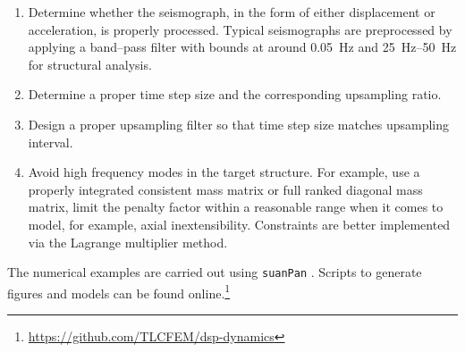\begin{enumerate}
\item Determine whether the seismograph, in the form of either displacement or acceleration, is properly processed. Typical seismographs are preprocessed by applying a band--pass filter with bounds at around \SI{0.05}{\hertz} and \SIrange{25}{50}{\hertz} for structural analysis.
\item Determine a proper time step size and the corresponding upsampling ratio.
\item Design a proper upsampling filter so that time step size matches upsampling interval.
\item Avoid high frequency modes in the target structure. For example, use a properly integrated consistent mass matrix or full ranked diagonal mass matrix, limit the penalty factor within a reasonable range when it comes to model, for example, axial inextensibility. Constraints are better implemented via the Lagrange multiplier method.
\end{enumerate}

The numerical examples are carried out using \texttt{suanPan} \citep{Chang2022}. Scripts to generate figures and models can be found online.\footnote{\url{https://github.com/TLCFEM/dsp-dynamics}}